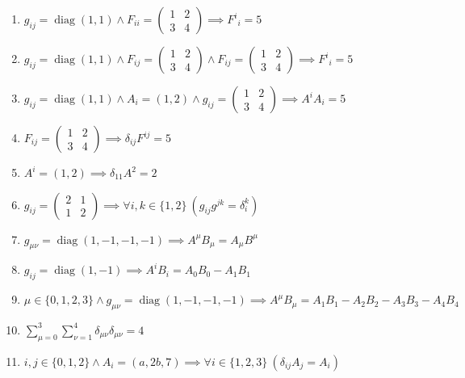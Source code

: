 \documentclass[11pt,a4paper]{article}
\begin{document}
\begin{enumerate}
\item $\displaystyle g_{ij} = \operatorname{diag}(1, 1) \land F_{ii} = \begin{pmatrix} 1 & 2 \\ 3 & 4 \end{pmatrix} \implies F^{i}{}_{i} = 5$
\item $\displaystyle g_{ij} = \operatorname{diag}(1, 1) \land F_{ij} = \begin{pmatrix} 1 & 2 \\ 3 & 4 \end{pmatrix} \land F_{ij} = \begin{pmatrix} 1 & 2 \\ 3 & 4 \end{pmatrix} \implies F^{i}{}_{i} = 5$
\item $\displaystyle g_{ij} = \operatorname{diag}(1, 1) \land A_{i} = (1, 2) \land g_{ij} = \begin{pmatrix} 1 & 2 \\ 3 & 4 \end{pmatrix} \implies A^{i} A_{i} = 5$
\item $\displaystyle F_{ij} = \begin{pmatrix} 1 & 2 \\ 3 & 4 \end{pmatrix} \implies \delta_{ij} F^{ij} = 5$
\item $\displaystyle A^{i} = (1, 2) \implies \delta_{11} A^{2} = 2$
\item $\displaystyle g_{ij} = \begin{pmatrix} 2 & 1 \\ 1 & 2 \end{pmatrix} \implies \forall i, k \in \{1, 2\}\ \left( g_{ij} g^{jk} = \delta_{i}^{k} \right)$
\item $\displaystyle g_{\mu\nu} = \operatorname{diag}(1, -1, -1, -1) \implies A^{\mu} B_{\mu} = A_{\mu} B^{\mu}$
\item $\displaystyle g_{ij} = \operatorname{diag}(1, -1) \implies A^{i} B_{i} = A_{0} B_{0} - A_{1} B_{1}$
\item $\displaystyle \mu \in \{0, 1, 2, 3\} \land g_{\mu\nu} = \operatorname{diag}(1, -1, -1, -1) \implies A^{\mu} B_{\mu} = A_{1} B_{1} - A_{2} B_{2} - A_{3} B_{3} - A_{4} B_{4}$
\item $\displaystyle \sum_{\mu=0}^{3} \sum_{\nu=1}^{4} \delta_{\mu\nu}\delta_{\mu\nu} = 4$
\item $\displaystyle i, j \in \{0, 1, 2\} \land A_{i} = (a, 2 b, 7) \implies \forall i \in \{1, 2, 3\}\ \left( \delta_{ij} A_{j} = A_{i} \right)$

\end{enumerate}
\end{document}
